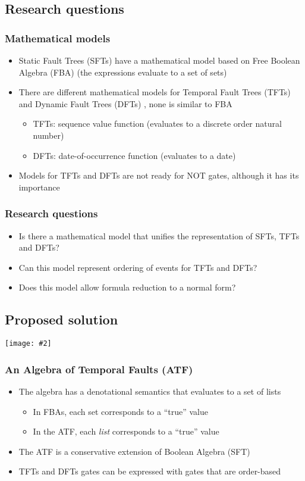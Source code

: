 \documentclass{beamer}
\def\SFT{%
	Static Fault Tree (SFT)%
	\gdef\SFT{SFT\xspace}%
	\gdef\SFTs{SFTs\xspace}%
	\xspace%
}
\def\SFTs{%
	Static Fault Trees (SFTs)%
	\gdef\SFT{SFT\xspace}%
	\gdef\SFTs{SFTs\xspace}%
	\xspace%
}
\def\TFT{%
	Temporal Fault Tree (TFT)%
	\gdef\TFT{TFT\xspace}%
	\gdef\TFTs{TFTs\xspace}%
	\xspace%
}
\def\TFTs{%
	Temporal Fault Trees (TFTs)%
	\gdef\TFT{TFT\xspace}%
	\gdef\TFTs{TFTs\xspace}%
	\xspace%
}
\def\DFT{%
	Dynamic Fault Tree (DFT)%
	\gdef\DFT{DFT\xspace}%
	\gdef\DFTs{DFTs\xspace}%
	\xspace%
}
\def\DFTs{%
	Dynamic Fault Trees (DFTs)%
	\gdef\DFT{DFT\xspace}%
	\gdef\DFTs{DFTs\xspace}%
	\xspace%
}
\def\FBA{%
	Free Boolean Algebra (FBA)%
	\gdef\FBA{FBA\xspace}%
	\gdef\FBAs{FBAs\xspace}%
	\gdef\iFBA{an FBA\xspace}%
	\xspace%
}
\def\FBAs{%
	Free Boolean Algebras (FBAs)%
	\gdef\FBA{FBA\xspace}%
	\gdef\FBAs{FBAs\xspace}%
	\gdef\iFBA{an FBA\xspace}%
	\xspace%
}
\def\iFBA{%
	a Free Boolean Algebra (FBA)%
	\gdef\FBA{FBA\xspace}%
	\gdef\FBAs{FBAs\xspace}%
	\gdef\iFBA{an FBA\xspace}%
	\xspace%
}
\def\ATF{%
	Algebra of Temporal Faults (ATF)%
	\gdef\ATF{ATF\xspace}%
	\gdef\iATF{an ATF\xspace}%
	\gdef\IATF{An ATF\xspace}%
	\xspace%
}
\def\IlATF{%
	An Algebra of Temporal Faults (ATF)%
	\gdef\ATF{ATF\xspace}%
	\gdef\iATF{an ATF\xspace}%
	\gdef\IATF{An ATF\xspace}%
	\xspace%
}
\def\iATF{%
	an Algebra of Temporal Faults (ATF)%
	\gdef\ATF{ATF\xspace}%
	\gdef\iATF{an ATF\xspace}%
	\gdef\IATF{An ATF\xspace}%
	\xspace%
}
\def\IATF{%
	An Algebra of Temporal Faults (ATF)%
	\gdef\ATF{ATF\xspace}%
	\gdef\iATF{an ATF\xspace}%
	\gdef\IATF{An ATF\xspace}%
	\xspace%
}
\newcommand{\includegraphicsaspectratio}[2][1]{%
  \texttt{[image: \#2]}%
}
\begin{document}
\subsection{Research questions}

\begin{frame}
	\frametitle{Mathematical models}
	\begin{itemize}
		\item \SFTs have a mathematical model based on \FBA (the expressions evaluate to a set of sets)
		\item There are different mathematical models for \TFTs and \DFTs, none is similar to \FBA
		\begin{itemize}
			\item \TFTs: sequence value function (evaluates to a discrete order natural number)
			\item \DFTs: date-of-occurrence function (evaluates to a date)
		\end{itemize}
		\item Models for \TFTs and \DFTs are not ready for NOT gates, although it has its importance
	\end{itemize}
\end{frame}

\begin{frame}
	\frametitle{Research questions}
	\begin{itemize}
		\item Is there a mathematical model that unifies the representation of \SFTs, \TFTs and \DFTs?
		\item Can this model represent ordering of events for \TFTs and \DFTs? 
		\item Does this model allow formula reduction to a normal form?
	\end{itemize}
\end{frame}

\subsection{Proposed solution}
\begin{frame}
	\begin{center}
		\includegraphicsaspectratio[1]{StrategyOverview}
	\end{center}
\end{frame}

\begin{frame}
	\frametitle{\IlATF}
	\begin{itemize}
		\item The algebra has a denotational semantics that evaluates to a set of lists
		\begin{itemize}
			\item In \FBAs, each set corresponds to a ``true'' value
			\item In the \ATF, each \emph{list} corresponds to a ``true'' value
		\end{itemize}
		\item The \ATF is a conservative extension of Boolean Algebra (\SFT)
		\item \TFTs and \DFTs gates can be expressed with gates that are order-based
	\end{itemize}
\end{frame}
\end{document}
